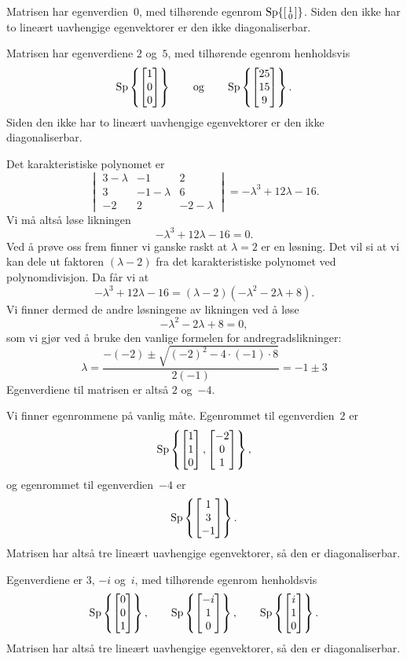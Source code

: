 \begin{losning}
\begin{punkt}
Matrisen har egenverdien~$0$, med tilhørende egenrom $\operatorname{Sp} \{ \left[ \begin{smallmatrix} 1 \\ 0 \end{smallmatrix} \right] \}$.
Siden den ikke har to lineært uavhengige egenvektorer er den
ikke diagonaliserbar.
\end{punkt}

\begin{punkt}
Matrisen har egenverdiene $2$ og~$5$, med tilhørende egenrom
henholdsvis
\[
\operatorname{Sp} \left\{ \begin{bmatrix} 1 \\ 0 \\ 0 \end{bmatrix} \right\}
\qquad\text{og}\qquad
\operatorname{Sp} \left\{ \begin{bmatrix} 25 \\ 15 \\ 9 \end{bmatrix} \right\}.
\]
Siden den ikke har to lineært uavhengige egenvektorer er den
ikke diagonaliserbar.
\end{punkt}

\begin{punkt}
Det karakteristiske polynomet er
\[
\begin{vmatrix}
3-\lambda & -1         & 2          \\
3         & -1-\lambda & 6          \\
-2        & 2          & -2-\lambda
\end{vmatrix}
=
-\lambda^3 + 12\lambda - 16.
\]
Vi må altså løse likningen
\[
-\lambda^3 + 12\lambda - 16 = 0.
\]
Ved å prøve oss frem finner vi ganske raskt at $\lambda=2$ er en
løsning.  Det vil si at vi kan dele ut faktoren $(\lambda-2)$ fra det
karakteristiske polynomet ved polynomdivisjon.  Da får vi at
\[
-\lambda^3 + 12\lambda - 16 = (\lambda - 2) (-\lambda^2 - 2\lambda + 8).
\]
Vi finner dermed de andre løsningene av likningen ved å løse
\[
-\lambda^2 - 2\lambda + 8 = 0,
\]
som vi gjør ved å bruke den vanlige formelen for andregradslikninger:
\[
\lambda
 = \frac{-(-2) \pm \sqrt{(-2)^2 - 4 \cdot (-1) \cdot 8}}{2 (-1)}
 = -1 \pm 3
\]
Egenverdiene til matrisen er altså $2$ og~$-4$.

Vi finner egenrommene på vanlig måte.  Egenrommet til egenverdien~$2$ er
\[
\operatorname{Sp} \left\{ \begin{bmatrix} 1 \\ 1 \\ 0 \end{bmatrix}, \begin{bmatrix} -2 \\ 0 \\ 1 \end{bmatrix} \right\},
\]
og egenrommet til egenverdien~$-4$ er
\[
\operatorname{Sp} \left\{ \begin{bmatrix} 1 \\ 3 \\ -1 \end{bmatrix} \right\}.
\]
Matrisen har altså tre lineært uavhengige egenvektorer, så den er
diagonaliserbar.
\end{punkt}

\begin{punkt}
Egenverdiene er $3$, $-i$ og~$i$, med tilhørende egenrom henholdsvis
\[
\operatorname{Sp} \left\{ \begin{bmatrix} 0 \\ 0 \\ 1 \end{bmatrix} \right\},\qquad
\operatorname{Sp} \left\{ \begin{bmatrix} -i \\ 1 \\ 0 \end{bmatrix} \right\},\qquad
\operatorname{Sp} \left\{ \begin{bmatrix} i \\ 1 \\ 0 \end{bmatrix} \right\}.
\]
Matrisen har altså tre lineært uavhengige egenvektorer, så den er
diagonaliserbar.
\end{punkt}


\end{losning}
